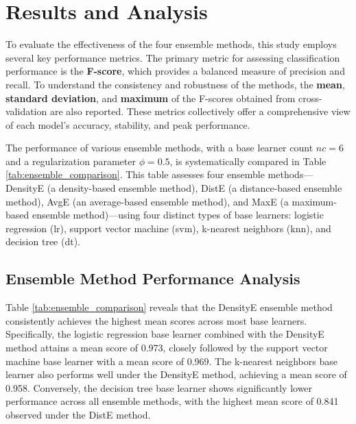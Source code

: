 \documentclass[lettersize,journal]{IEEEtran}
\begin{document}
	\section{Results and Analysis}\label{sec:results}
	
	\noindent To evaluate the effectiveness of the four ensemble methods, this study employs several key performance metrics. The primary metric for assessing classification performance is the \textbf{F-score}, which provides a balanced measure of precision and recall. To understand the consistency and robustness of the methods, the \textbf{mean}, \textbf{standard deviation}, and \textbf{maximum} of the F-scores obtained from cross-validation are also reported. These metrics collectively offer a comprehensive view of each model's accuracy, stability, and peak performance.
	
	\noindent The performance of various ensemble methods, with a base learner count $nc = 6$ and a regularization parameter $\phi = 0.5$, is systematically compared in Table \ref{tab:ensemble_comparison}. This table assesses four ensemble methods—DensityE (a density-based ensemble method), DistE (a distance-based ensemble method), AvgE (an average-based ensemble method), and MaxE (a maximum-based ensemble method)—using four distinct types of base learners: logistic regression (lr), support vector machine (svm), k-nearest neighbors (knn), and decision tree (dt).
	
	\subsection{Ensemble Method Performance Analysis}
	
	\noindent Table \ref{tab:ensemble_comparison} reveals that the DensityE ensemble method consistently achieves the highest mean scores across most base learners. Specifically, the logistic regression base learner combined with the DensityE method attains a mean score of 0.973, closely followed by the support vector machine base learner with a mean score of 0.969. The k-nearest neighbors base learner also performs well under the DensityE method, achieving a mean score of 0.958.
	Conversely, the decision tree base learner shows significantly lower performance across all ensemble methods, with the highest mean score of 0.841
	observed under the DistE method.
	
	\setlength{\tabcolsep}{2pt} %
	
\end{document}
